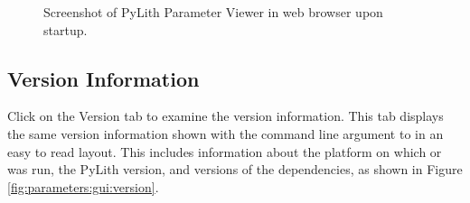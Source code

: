 \begin{figure}[htbp]
  \caption{Screenshot of PyLith Parameter Viewer in web browser upon startup.}
  \label{fig:parameters:gui:startup} 
\end{figure}


\subsection{Version Information}

Click on the \textsf{Version} tab to examine the version information.
This tab displays the same version information shown with the
 command line argument to  in
an easy to read layout.  This includes information about the platform
on which  or  was run, the
PyLith version, and versions of the dependencies, as shown in Figure
\ref{fig:parameters:gui:version}.

